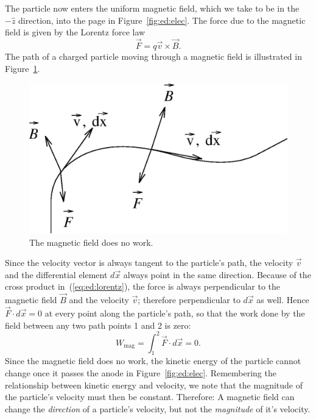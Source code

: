The particle now enters the uniform magnetic field, which we take to be in the 
$-\hat{z}$ direction, into the page in Figure~\ref{fig:ed:elec}. The force due 
to the magnetic field is given by the Lorentz force law
\begin{equation}
\vec{F} = q\vec{v}\times\vec{B}.  \label{eq:ed:lorentz}
\end{equation}
The path of a charged particle moving through a magnetic field is illustrated 
in Figure~\ref{fig:ed:lorentz}.
\begin{figure}[htb]
\centering \epsfxsize=7cm \includegraphics[scale=0.6]{3_electrondynamics/lorentz.eps}
\caption{The magnetic field does no work.}
\label{fig:ed:lorentz}
\end{figure}
Since the velocity vector is always tangent to the particle's path, the 
velocity $\vec{v}$ and the differential element $d\vec{x}$ always point in the 
same direction.  Because of the cross product in~(\ref{eq:ed:lorentz}), the 
force is always perpendicular to the magnetic field $\vec{B}$ and the velocity 
$\vec{v}$; therefore perpendicular to $d\vec{x}$ as well. Hence 
$\vec{F}\cdot d\vec{x}=0$ at every point along the particle's path, so that 
the work done by the field between any two path points 1 and 2 is zero:
$$
W_{\mbox{mag}} = \int_1^2 \vec{F}\cdot d\vec{x}=0.
$$
Since the magnetic field does no work, the kinetic energy of the particle 
cannot change once it passes the anode in Figure~\ref{fig:ed:elec}. 
Remembering the relationship between kinetic energy and velocity, we note that 
the magnitude of the particle's velocity must then be constant.  Therefore: A 
magnetic field can change the {\it direction} of a particle's velocity, but 
not the {\it magnitude} of it's velocity.

